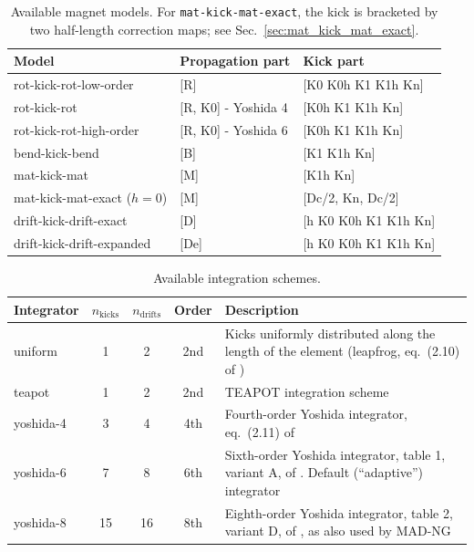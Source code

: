 \begin{table}[t]
\centering
\begin{tabular}{lll}
\toprule
\textbf{Model} & \textbf{Propagation part} & \textbf{Kick part} \\
\midrule
rot-kick-rot-low-order & [R] & [K0 K0h K1 K1h Kn] \\
rot-kick-rot & [R, K0] - Yoshida 4 & [K0h K1 K1h Kn] \\
rot-kick-rot-high-order & [R, K0] - Yoshida 6 & [K0h K1 K1h Kn] \\
bend-kick-bend & [B] & [K1 K1h Kn] \\
mat-kick-mat & [M] & [K1h Kn] \\
mat-kick-mat-exact ($h=0$) & [M] & [Dc/2, Kn, Dc/2] \\
drift-kick-drift-exact & [D] & [h K0 K0h K1 K1h Kn] \\
drift-kick-drift-expanded & [De] & [h K0 K0h K1 K1h Kn] \\
\bottomrule
\end{tabular}
\caption{Available magnet models. For \texttt{mat-kick-mat-exact}, the kick
is bracketed by two half-length correction maps; see
Sec.~\ref{sec:mat_kick_mat_exact}. \label{tab:models}}
\end{table}


\begin{table}[t]
\centering
\begin{tabular}{lcccp{6.5cm}}
\toprule
\textbf{Integrator} & \textbf{$n_\text{kicks}$} & \textbf{$n_\text{drifts}$} & \textbf{Order} & \textbf{Description}\\
\midrule
uniform & 1 & 2 & 2nd &
    Kicks uniformly distributed along the length of the element
    (leapfrog, eq.~(2.10) of \cite{yoshida90}) \\
teapot & 1 & 2 & 2nd &
    TEAPOT integration scheme \cite{Talman:533900, Burkhardt:2013eua} \\
yoshida-4 & 3 & 4 & 4th &
    Fourth-order Yoshida integrator, eq.~(2.11) of \cite{yoshida90} \\
yoshida-6 & 7 & 8 & 6th &
    Sixth-order Yoshida integrator, table 1, variant A, of \cite{yoshida90}.
    Default (``adaptive'') integrator \\
yoshida-8 & 15 & 16 & 8th &
    Eighth-order Yoshida integrator, table 2, variant D, of \cite{yoshida90},
    as also used by MAD-NG \cite{madng_github} \\
\bottomrule
\end{tabular}
\caption{Available integration schemes. \label{tab:integrators}}
\end{table}

